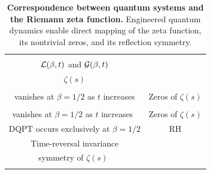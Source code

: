 \documentclass[aps,pra,twocolumn,superscriptaddress,preprintnumbers,amsmath,amssymb]{revtex4-2}
\begin{document}
\begin{table}[!ht]
\caption{\textbf{Correspondence between quantum systems and the Riemann zeta function.} Engineered quantum dynamics enable direct mapping of the zeta function, its nontrivial zeros, and its  reflection symmetry.}
\label{tab:scaling}
\centering
\renewcommand{\arraystretch}{2.5}
\begin{tabular}{|c|c|}
\Xhline{0.7pt}
\makecell{\textbf{Physical observables} \\ ${\cal L}( \beta,t)$ and ${\cal G}(\beta,t)$} & \makecell{\textbf{Zeta function} \\ $\zeta(s)$ }\\
\Xhline{0.7pt}
\makecell{Accumulated phase factor ${\cal L}( \beta, t)$ \\ vanishes at $\beta = 1/2 $ as $t$ increases} & Zeros of $\zeta(s)$ \\
\hline
\makecell{Loschmidt amplitude ${\cal G}(\beta,t)$ \\ vanishes at  $\beta = 1/2 $  as $t$ increases~} & Zeros of $\zeta(s)$ \\
\hline
DQPT occurs exclusively at  $\beta = 1/2 $ & RH\\
\hline
Time-reversal invariance & \makecell{Reflection \\ ~symmetry of $\zeta(s)$ ~} \\
\Xhline{0.7pt}
\end{tabular}
\label{correspondence}
\end{table}

 
\end{document}
